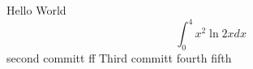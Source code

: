 \documentclass{article}
\begin{document}
Hello World
$$\int_0^4 x^2 \ln{2x}dx$$
second committ  ff
Third committ 
fourth
fifth
\end{document}
